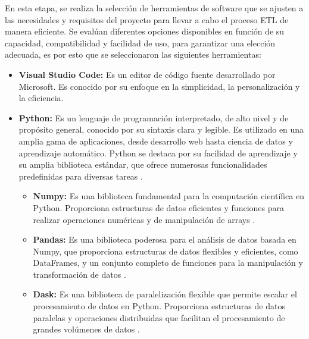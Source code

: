En esta etapa, se realiza la selección de herramientas de software que se ajusten a las necesidades y requisitos del proyecto para llevar a cabo el proceso ETL de manera eficiente. Se evalúan diferentes opciones disponibles en función de su capacidad, compatibilidad y facilidad de uso, para garantizar una elección adecuada, es por esto que se seleccionaron las siguientes herramientas:
\begin{itemize}
    \item \textbf{Visual Studio Code:} Es un editor de código fuente desarrollado por Microsoft. Es conocido por su enfoque en la simplicidad, la personalización y la eficiencia. 
    \item \textbf{Python:} Es un lenguaje de programación interpretado, de alto nivel y de propósito general, conocido por su sintaxis clara y legible. Es utilizado en una amplia gama de aplicaciones, desde desarrollo web hasta ciencia de datos y aprendizaje automático. Python se destaca por su facilidad de aprendizaje y su amplia biblioteca estándar, que ofrece numerosas funcionalidades predefinidas para diversas tareas \cite{python}.
    \begin{itemize}
        \item \textbf{Numpy:} Es una biblioteca fundamental para la computación científica en Python. Proporciona estructuras de datos eficientes y funciones para realizar operaciones numéricas y de manipulación de arrays \cite{numpy}.
        \item \textbf{Pandas:} Es una biblioteca poderosa para el análisis de datos basada en Numpy, que proporciona estructuras de datos flexibles y eficientes, como DataFrames, y un conjunto completo de funciones para la manipulación y transformación de datos \cite{pandas}.
        \item \textbf{Dask:} Es una biblioteca de paralelización flexible que permite escalar el procesamiento de datos en Python. Proporciona estructuras de datos paralelas y operaciones distribuidas que facilitan el procesamiento de grandes volúmenes de datos \cite{dask}.
    \end{itemize}
\end{itemize}
